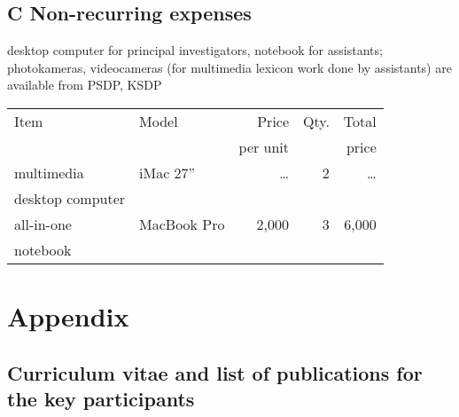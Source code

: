 \documentclass[a4paper,12pt]{article}
\begin{document}


\subsection*{C Non-recurring expenses}
\noindent desktop computer for principal investigators, notebook for assistants; photokameras, videocameras (for multimedia lexicon work done by assistants) are available from PSDP, KSDP %
\begin{longtable}{| l | l | r | r | r |}
\hline
Item&Model&Price&Qty.&Total\\
	&&per unit&&price\\
\hline
multimedia&iMac 27”&…&2&…\\
desktop computer&&&&\\
\hline
all-in-one&MacBook Pro&2,000&3&6,000\\
notebook&&&&\\
\hline
\end{longtable}

\newpage
\section*{Appendix}
\subsection*{Curriculum vitae and list of publications for the key participants}
\end{document}
